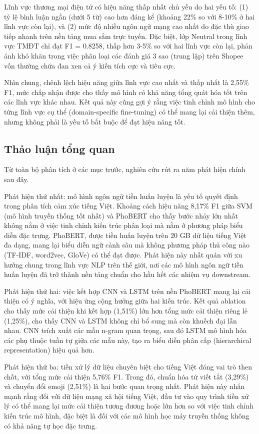 \documentclass[14pt, a4paper]{report}
\begin{document}
Lĩnh vực thương mại điện tử có hiệu năng thấp nhất chủ yếu do hai yếu tố: (1) tỷ lệ bình luận ngắn (dưới 5 từ) cao hơn đáng kể (khoảng 22\% so với 8-10\% ở hai lĩnh vực còn lại), và (2) mức độ nhiễu ngôn ngữ mạng cao nhất do đặc thù giao tiếp nhanh trên nền tảng mua sắm trực tuyến. Đặc biệt, lớp Neutral trong lĩnh vực TMĐT chỉ đạt F1 = 0.8258, thấp hơn 3-5\% so với hai lĩnh vực còn lại, phản ánh khó khăn trong việc phân loại các đánh giá 3 sao (trung lập) trên Shopee vốn thường chứa đan xen cả ý kiến tích cực và tiêu cực.


Nhìn chung, chênh lệch hiệu năng giữa lĩnh vực cao nhất và thấp nhất là 2,55\% F1, mức chấp nhận được cho thấy mô hình có khả năng tổng quát hóa tốt trên các lĩnh vực khác nhau. Kết quả này cũng gợi ý rằng việc tinh chỉnh mô hình cho từng lĩnh vực cụ thể (domain-specific fine-tuning) có thể mang lại cải thiện thêm, nhưng không phải là yếu tố bắt buộc để đạt hiệu năng tốt.


\subsection{Thảo luận tổng quan}


Từ toàn bộ phân tích ở các mục trước, nghiên cứu rút ra năm phát hiện chính sau đây.


Phát hiện thứ nhất: mô hình ngôn ngữ tiền huấn luyện là yếu tố quyết định trong phân tích cảm xúc tiếng Việt. Khoảng cách hiệu năng 8,17\% F1 giữa SVM (mô hình truyền thống tốt nhất) và PhoBERT cho thấy bước nhảy lớn nhất không nằm ở việc tinh chỉnh kiến trúc phân loại mà nằm ở phương pháp biểu diễn đặc trưng. PhoBERT, được tiền huấn luyện trên 20 GB dữ liệu tiếng Việt đa dạng, mang lại biểu diễn ngữ cảnh sâu mà không phương pháp thủ công nào (TF-IDF, word2vec, GloVe) có thể đạt được. Phát hiện này nhất quán với xu hướng chung trong lĩnh vực NLP trên thế giới, nơi các mô hình ngôn ngữ tiền huấn luyện đã trở thành nền tảng chuẩn cho hầu hết các nhiệm vụ downstream.


Phát hiện thứ hai: việc kết hợp CNN và LSTM trên nền PhoBERT mang lại cải thiện có ý nghĩa, với hiệu ứng cộng hưởng giữa hai kiến trúc. Kết quả ablation cho thấy mức cải thiện khi kết hợp (1,51\%) lớn hơn tổng mức cải thiện riêng lẻ (1,25\%), cho thấy CNN và LSTM không chỉ bổ sung mà còn khuếch đại lẫn nhau. CNN trích xuất các mẫu n-gram quan trọng, sau đó LSTM mô hình hóa các phụ thuộc tuần tự giữa các mẫu này, tạo ra biểu diễn phân cấp (hierarchical representation) hiệu quả hơn.


Phát hiện thứ ba: tiền xử lý dữ liệu chuyên biệt cho tiếng Việt đóng vai trò then chốt, với tổng mức cải thiện 5,76\% F1. Trong đó, chuẩn hóa từ viết tắt (3,29\%) và chuyển đổi emoji (2,51\%) là hai bước quan trọng nhất. Phát hiện này nhấn mạnh rằng đối với dữ liệu mạng xã hội tiếng Việt, đầu tư vào quy trình tiền xử lý có thể mang lại mức cải thiện tương đương hoặc lớn hơn so với việc tinh chỉnh kiến trúc mô hình, đặc biệt là đối với các mô hình học máy truyền thống không có khả năng tự học đặc trưng.
\end{document}
